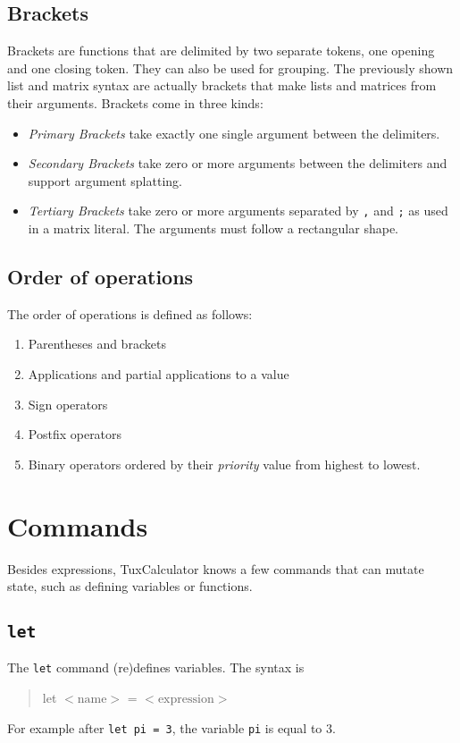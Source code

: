 \documentclass[10pt]{article}
\newcommand{\argument}[1]{{${\big<}\mathrm{#1}{\big>}$}}
\newenvironment{code}{\begin{quote}\ttfamily}{\end{quote}}
\begin{document}
    \subsection{Brackets}\label{subsec:brackets}
    Brackets are functions that are delimited by two separate tokens, one opening and one closing token.
    They can also be used for grouping.
    The previously shown list and matrix syntax are actually brackets that make lists and matrices from their arguments.
    Brackets come in three kinds:
    \begin{itemize}
        \item \textsl{Primary Brackets} take exactly one single argument between the delimiters.
        \item \textsl{Secondary Brackets} take zero or more arguments between the delimiters and support argument splatting.
        \item \textsl{Tertiary Brackets} take zero or more arguments separated by \verb|,| and \verb|;| as used in a matrix literal.
              The arguments must follow a rectangular shape.
    \end{itemize}
    
    \subsection{Order of operations}\label{subsec:order-of-operations}
    The order of operations is defined as follows:
    \begingroup
    \setlength{\parskip}{0pt}
    \begin{enumerate}
        \item Parentheses and brackets
        \item Applications and partial applications to a value
        \item Sign operators
        \item Postfix operators
        \item Binary operators ordered by their \textsl{priority} value from highest to lowest.
    \end{enumerate}
    \endgroup
    
    \section{Commands}\label{sec:commands}
    Besides expressions, TuxCalculator knows a few commands that can mutate state, such as defining variables or functions.
    
    \subsection{\texttt{let}}\label{subsec:cmd-let}
    The \verb|let| command {\small(re)}defines variables.
    The syntax is
    \begin{code}
        let \argument{name} = \argument{expression}
    \end{code}
    For example after \verb|let pi = 3|, the variable \verb|pi| is equal to $ 3 $.
    
\end{document}
